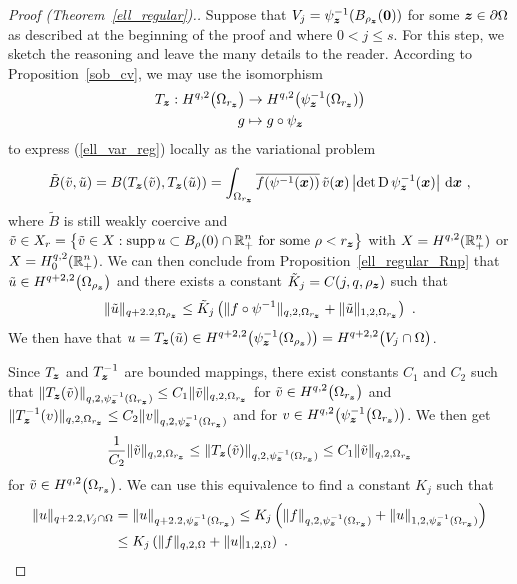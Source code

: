 \begin{proof}[Proof (Theorem~\ref{ell_regular}).]
Suppose that $V_j = \psi_{{\bm{z}}}^{-1}(B_{\rho_{\bm{z}}}({\bm{0}}))$
for some ${\bm{z}} \in \partial \Omega$ as described at the beginning
of the proof and where $0<j \leq s$.  For this step, we sketch the
reasoning and leave the many details to the reader.  According to
Proposition~\ref{sob_cv}, we may use the isomorphism
\begin{align*}
T_{{\bm{z}}}:  H^{q,2}\big(\Omega_{r_{{\bm{z}}}}\big) & \to 
H^{q,2}\big(\psi_{{\bm{z}}}^{-1}(\Omega_{r_{{\bm{z}}}})\big) \\
g &\mapsto g \circ \psi_{{\bm{z}}}
\end{align*}
to express (\ref{ell_var_reg}) locally as the variational problem
\[
\tilde{B}(\tilde{v},\tilde{u})
= B(T_{\VEC{z}}(\tilde{v}),T_{\VEC{z}}(\tilde{u}))
= \int_{\Omega_{r_\VEC{z}}} \overline{f(\psi^{-1}(\VEC{x}))}\,\tilde{v}(\VEC{x})
\left|\det \diff \psi_{\VEC{z}}^{-1}(\VEC{x})\right| \dx{\VEC{x}} \ ,
\]
where $\tilde{B}$ is still weakly coercive and\\
$\tilde{v} \in \displaystyle X_r = \left\{ \tilde{v} \in X : \operatorname{supp} u \subset
B_\rho(0)\cap \mathbb{R}^n_+ \ \text{for some} \ \rho < r_{{\bm{z}}} \right\}$
with $\displaystyle X = H^{q,2}(\mathbb{R}^n_+)$ or
$\displaystyle X = H^{q,2}_0(\mathbb{R}^n_+)$.
We can then conclude from Proposition~\ref{ell_regular_Rnp} that
$\displaystyle \tilde{u}\in H^{q+2,2}\big(\Omega_{\rho_{\bm{z}}}\big)$ and there
exists a constant $\tilde{K}_j = C(j,q,\rho_{{\bm{z}}})$ such that
\[
\|\tilde{u}\|_{q+2.2,\Omega_{\rho_{\bm{z}}}} \leq \tilde{K}_j
\left( \|f\circ \psi^{-1}\|_{q,2,\Omega_{r_{\bm{z}}}} +
\|\tilde{u}\|_{1,2,\Omega_{r_{\bm{z}}}} \right) \ .
\]
We then have that
$\displaystyle u = T_{{\bm{z}}}(\tilde{u}) \in H^{q+2,2}
\big(\psi_{{\bm{z}}}^{-1}(\Omega_{\rho_{\bm{z}}})\big)
= H^{q+2,2} \big(V_j \cap \Omega\big)$.

Since $T_{{\bm{z}}}$ and $\displaystyle T_{{\bm{z}}}^{-1}$ are bounded
mappings, there exist constants $C_1$ and $C_2$ such that
$\displaystyle
\|T_{{\bm{z}}}(\tilde{v})\|_{q,2,\psi^{-1}_{{\bm{z}}}(\Omega_{r_{\bm{z}}})}
\leq C_1 \|\tilde{v}\|_{q,2,\Omega_{r_{\bm{z}}}}$
for $\displaystyle \tilde{v} \in H^{q,2}\big(\Omega_{r_{{\bm{z}}}}\big)$
and
$\displaystyle
\|T_{{\bm{z}}}^{-1}(v)\|_{q,2,\Omega_{r_{\bm{z}}}}
\leq C_2 \|v\|_{q,2,\psi^{-1}_{{\bm{z}}}(\Omega_{r_{\bm{z}}})}$ and
for $\displaystyle v \in
H^{q,2}\big(\psi_{{\bm{z}}}^{-1}\big(\Omega_{r_{{\bm{z}}}})\big)$.
We then get
\[
  \frac{1}{C_2} \|\tilde{v}\|_{q,2,\Omega_{r_{\bm{z}}}}
\leq \|T_{{\bm{z}}}(\tilde{v})\|_{q,2,\psi^{-1}_{{\bm{z}}}(\Omega_{r_{\bm{z}}})}
\leq C_1 \|\tilde{v}\|_{q,2,\Omega_{r_{\bm{z}}}}
\]
for $\displaystyle \tilde{v} \in H^{q,2}\big(\Omega_{r_{{\bm{z}}}}\big)$.
We can use this equivalence to find a constant $K_j$ such that
\begin{align*}
\|u\|_{q+2.2,V_j\cap \Omega}
&= \|u\|_{q+2.2,\psi^{-1}_{{\bm{z}}}(\Omega_{r_{\bm{z}}})}
\leq K_j \left( \|f\|_{q,2,\psi^{-1}_{{\bm{z}}}(\Omega_{r_{\bm{z}}})} +
\|u\|_{1,2,\psi_{\bm{z}}^{-1}(\Omega_{r_{\bm{z}}})} \right) \\
&\leq K_j \left( \|f\|_{q,2,\Omega} + \|u\|_{1,2,\Omega} \right) \ .
\end{align*}


\end{proof}

